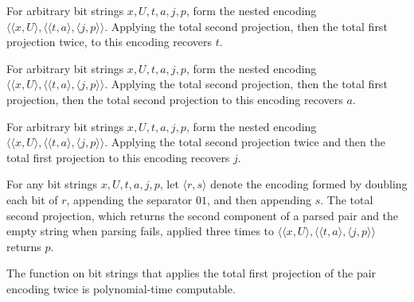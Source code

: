 \begin{theorem}
\label{Complexity.Meyer.vt_vin}
\leanok
{}
For arbitrary bit strings $x,U,t,a,j,p$, form the nested encoding $\langle\langle
x,U\rangle,\langle\langle t,a\rangle,\langle j,p\rangle\rangle$. Applying the total
second projection, then the total first projection twice, to this encoding recovers $t$.
\end{theorem}

\begin{theorem}
\label{Complexity.Meyer.va_vin}
\leanok
{}
For arbitrary bit strings $x,U,t,a,j,p$, form the nested encoding $\langle\langle
x,U\rangle,\langle\langle t,a\rangle,\langle j,p\rangle\rangle$. Applying the total
second projection, then the total first projection, then the total second projection to
this encoding recovers $a$.
\end{theorem}

\begin{theorem}
\label{Complexity.Meyer.vj_vin}
\leanok
{}
For arbitrary bit strings $x,U,t,a,j,p$, form the nested encoding $\langle\langle
x,U\rangle,\langle\langle t,a\rangle,\langle j,p\rangle\rangle$. Applying the total
second projection twice and then the total first projection to this encoding recovers
$j$.
\end{theorem}

\begin{theorem}
\label{Complexity.Meyer.vp_vin}
\leanok
{}
For any bit strings $x,U,t,a,j,p$, let $\langle r,s\rangle$ denote the encoding formed
by doubling each bit of $r$, appending the separator $01$, and then appending $s$. The
total second projection, which returns the second component of a parsed pair and the
empty string when parsing fails, applied three times to $\langle\langle
x,U\rangle,\langle\langle t,a\rangle,\langle j,p\rangle\rangle$ returns $p$.
\end{theorem}

\begin{theorem}
\label{Complexity.Meyer.pt_vx}
\leanok
{}
The function on bit strings that applies the total first projection of the pair encoding
twice is polynomial-time computable.
\end{theorem}

